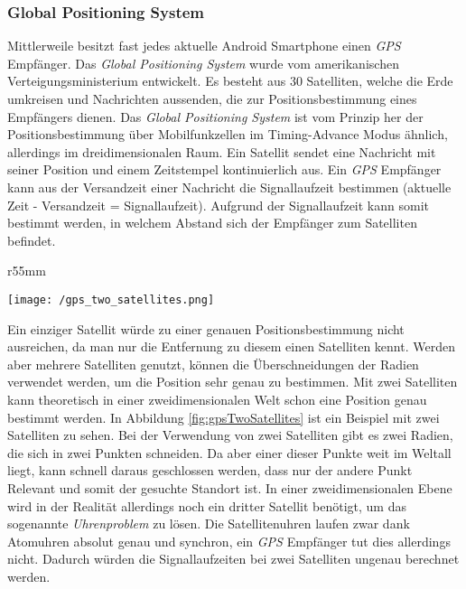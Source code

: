 \subsubsection{Global Positioning System}
Mittlerweile besitzt fast jedes aktuelle Android Smartphone einen \textit{GPS} Empfänger. 
Das \textit{Global Positioning System} wurde vom amerikanischen Verteigungsministerium entwickelt. Es besteht aus 30 Satelliten, welche die Erde umkreisen und Nachrichten aussenden, die zur Positionsbestimmung eines Empfängers dienen. Das \textit{Global Positioning System} ist vom Prinzip her der Positionsbestimmung über Mobilfunkzellen im Timing-Advance Modus ähnlich, allerdings im dreidimensionalen Raum. 
Ein Satellit sendet eine Nachricht mit seiner Position und einem Zeitstempel kontinuierlich aus.
Ein \textit{GPS} Empfänger kann aus der Versandzeit einer Nachricht die Signallaufzeit bestimmen (aktuelle Zeit - Versandzeit = Signallaufzeit). Aufgrund der Signallaufzeit kann somit bestimmt werden, in welchem Abstand sich der Empfänger zum Satelliten befindet. 
\begin{wrapfigure}{r}{55mm}
\centering
   \begin{center}
   	\texttt{[image: /gps\_two\_satellites.png]} 
   \end{center}
   \caption[Lokalisierung: GPS 2 Satelliten]{GPS 2 Satelliten}
   \label{fig:gpsTwoSatellites}
\end{wrapfigure}
Ein einziger Satellit würde zu einer genauen Positionsbestimmung nicht ausreichen, da man nur die Entfernung zu diesem einen Satelliten kennt. Werden aber mehrere Satelliten genutzt, können die Überschneidungen der Radien verwendet werden, um die Position sehr genau zu bestimmen. Mit zwei Satelliten kann theoretisch in einer zweidimensionalen Welt schon eine Position genau bestimmt werden. In Abbildung \ref{fig:gpsTwoSatellites} ist ein Beispiel mit zwei Satelliten zu sehen. Bei der Verwendung von zwei Satelliten gibt es zwei Radien, die sich in zwei Punkten schneiden. Da aber einer dieser Punkte weit im Weltall liegt, kann schnell daraus geschlossen werden, dass nur der andere Punkt Relevant und somit der gesuchte Standort ist. In einer zweidimensionalen Ebene wird in der Realität allerdings noch ein dritter Satellit benötigt, um das sogenannte \textit{Uhrenproblem} zu lösen. Die Satellitenuhren laufen zwar dank Atomuhren absolut genau und synchron, ein \textit{GPS} Empfänger tut dies allerdings nicht. Dadurch würden die Signallaufzeiten bei zwei Satelliten ungenau berechnet werden. 

